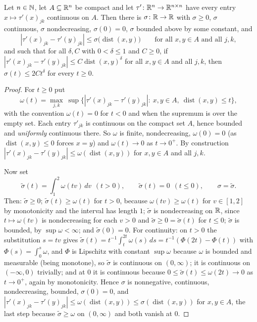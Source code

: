 \begin{lemma}
Let $n\in\mathbb{N}$, let $A\subseteq\mathbb{R}^n$ be compact and let
$\tau'\colon\mathbb{R}^n\to\mathbb{R}^{n\times n}$ have every entry $x\mapsto\tau'(x)_{jk}$
continuous on $A$.  Then there is $\sigma\colon\mathbb{R}\to\mathbb{R}$ with $\sigma\ge0$,
$\sigma$ continuous, $\sigma$ nondecreasing, $\sigma(0)=0$, $\sigma$ bounded
above by some constant, and
\[
|\tau'(x)_{jk}-\tau'(y)_{jk}|\le\sigma\bigl(\operatorname{dist}(x,y)\bigr)
\qquad\text{for all }x,y\in A\text{ and all }j,k,
\]
and such that for all $\delta,C$ with $0<\delta\le1$ and $C\ge0$, if
$|\tau'(x)_{jk}-\tau'(y)_{jk}|\le C\operatorname{dist}(x,y)^\delta$ for all
$x,y\in A$ and all $j,k$, then $\sigma(t)\le 2Ct^\delta$ for every $t\ge0$.
\end{lemma}
\begin{proof}
For $t\ge0$ put
\[
\omega(t)=\max_{j,k}\ \sup\bigl\{|\tau'(x)_{jk}-\tau'(y)_{jk}|:\
x,y\in A,\ \operatorname{dist}(x,y)\le t\bigr\} ,
\]
with the convention $\omega(t)=0$ for $t<0$ and when the supremum is over the
empty set.  Each entry $\tau'_{jk}$ is continuous on the compact set $A$, hence
bounded and \emph{uniformly} continuous there.  So $\omega$ is finite,
nondecreasing, $\omega(0)=0$ (as $\operatorname{dist}(x,y)\le0$ forces $x=y$)
and $\omega(t)\to0$ as $t\to0^+$.  By construction
$|\tau'(x)_{jk}-\tau'(y)_{jk}|\le\omega(\operatorname{dist}(x,y))$ for
$x,y\in A$ and all $j,k$.

Now set
\[
\tilde\sigma(t)=\int_1^2\omega(tv)\,dv\ \ (t>0),\qquad
\tilde\sigma(t)=0\ \ (t\le0),\qquad \sigma=\tilde\sigma .
\]
Then: $\tilde\sigma\ge0$; $\tilde\sigma(t)\ge\omega(t)$ for $t>0$, because
$\omega(tv)\ge\omega(t)$ for $v\in[1,2]$ by monotonicity and the interval has
length $1$; $\tilde\sigma$ is nondecreasing on $\mathbb{R}$, since $t\mapsto\omega(tv)$
is nondecreasing for each $v>0$ and $\tilde\sigma\ge0=\tilde\sigma(t)$ for
$t\le0$; $\tilde\sigma$ is bounded, by $\sup\omega<\infty$; and
$\tilde\sigma(0)=0$.  For continuity: on $t>0$ the substitution $s=tv$ gives
$\tilde\sigma(t)=t^{-1}\int_t^{2t}\omega(s)\,ds=t^{-1}(\Phi(2t)-\Phi(t))$ with
$\Phi(s)=\int_0^s\omega$, and $\Phi$ is Lipschitz with constant $\sup\omega$
because $\omega$ is bounded and measurable (being monotone), so $\tilde\sigma$ is
continuous on $(0,\infty)$; it is continuous on $(-\infty,0)$ trivially; and at
$0$ it is continuous because $0\le\tilde\sigma(t)\le\omega(2t)\to0$ as
$t\to0^+$, again by monotonicity.  Hence $\sigma$ is nonnegative, continuous,
nondecreasing, bounded, $\sigma(0)=0$, and
$|\tau'(x)_{jk}-\tau'(y)_{jk}|\le\omega(\operatorname{dist}(x,y))
\le\sigma(\operatorname{dist}(x,y))$ for $x,y\in A$, the last step because
$\tilde\sigma\ge\omega$ on $(0,\infty)$ and both vanish at $0$.


\end{proof}
